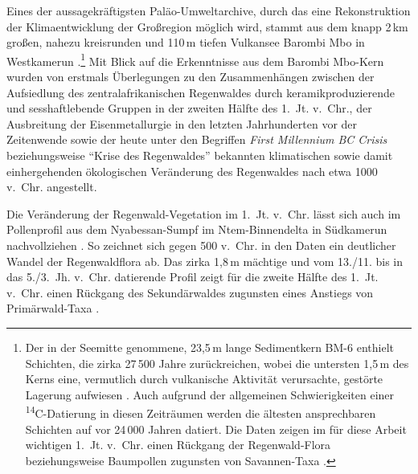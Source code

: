 \begin{multicols}{2}
Eines der aussagekräftigsten Paläo-Umweltarchive, durch das eine Rekonstruktion der Klimaentwicklung der Großregion möglich wird, stammt aus dem knapp 2\,km großen, nahezu kreisrunden und 110\,m tiefen Vulkansee Barombi Mbo in Westkamerun \parencite[159--161]{Maley.1998b}.\footnote{Der in der Seemitte genommene, 23,5\,m lange Sedimentkern BM-6 enthielt Schichten, die zirka 27\,500 Jahre zurückreichen, wobei die untersten 1,5\,m des Kerns eine, vermutlich durch vulkanische Aktivität verursachte, gestörte Lagerung aufwiesen \parencite[6 Abb. 1]{Maley.2001}. Auch aufgrund der allgemeinen Schwierigkeiten einer \textsuperscript{14}C-Datierung in diesen Zeiträumen werden die ältesten ansprechbaren Schichten auf vor 24\,000 Jahren datiert. Die Daten zeigen im für diese Arbeit wichtigen 1.~Jt. v.~Chr. einen Rückgang der Regenwald-Flora beziehungsweise Baumpollen zugunsten von Savannen-Taxa  \parencites[6 Abb. 1]{Maley.2001}[56--58]{Maley.2003}.} Mit Blick auf die Erkenntnisse aus dem Barombi Mbo-Kern wurden von \textcite[357--360]{Schwartz.1992} erstmals Überlegungen zu den Zusammenhängen zwischen der Aufsiedlung des zentralafrikanischen Regenwaldes durch keramikproduzierende und sesshaftlebende Gruppen in der zweiten Hälfte des 1.~Jt. v.~Chr., der Ausbreitung der Eisenmetallurgie in den letzten Jahrhunderten vor der Zeitenwende sowie der heute unter den Begriffen \textit{First Millennium BC Crisis} \parencite[63]{Sangen.2009} beziehungsweise \enquote{Krise des Regenwaldes} \parencite{Neumann.2014} bekannten klimatischen sowie damit einhergehenden ökologischen Veränderung des Regenwaldes nach etwa 1000 v.~Chr. angestellt.

Die Veränderung der Regenwald-Vegetation im 1.~Jt. v.~Chr. lässt sich auch im Pollenprofil aus dem Nyabessan-Sumpf im Ntem-Binnendelta in Südkamerun nachvollziehen \parencite[316]{Ngomanda.2009}. So zeichnet sich gegen 500 v.~Chr. in den Daten ein deutlicher Wandel der Regenwaldflora ab. Das zirka 1,8\,m mächtige und vom 13./11. bis in das 5./3.~Jh. v.~Chr. datierende Profil zeigt für die zweite Hälfte des 1.~Jt. v.~Chr. einen Rückgang des Sekundärwaldes zugunsten eines Anstiegs von Primärwald-Taxa \parencite[ebd. 311 Abb.~3; ][58 Abb.~5]{Neumann.2012}.


\end{multicols}
